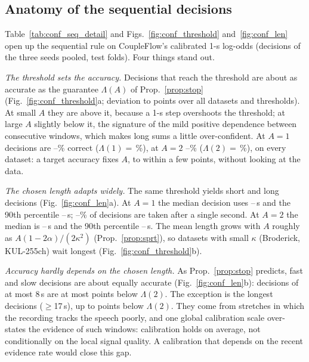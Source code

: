 \subsection{Anatomy of the sequential decisions}\label{app:conf:anatomy}
Table~\ref{tab:conf_seq_detail} and Figs.~\ref{fig:conf_threshold} and~\ref{fig:conf_len}
open up the sequential rule on CoupleFlow's calibrated 1-s log-odds (decisions of the three
seeds pooled, test folds). Four things stand out.

\emph{The threshold sets the accuracy.} Decisions that reach the threshold are about as
accurate as the guarantee $\Lambda(A)$ of Prop.~\ref{prop:stop}
(Fig.~\ref{fig:conf_threshold}a; deviation \confDetAboveMin{} to \confDetAboveMax{} points over
all datasets and thresholds). At small $A$ they are above it, because a 1-s step overshoots
the threshold; at large $A$ slightly below it, the signature of the mild positive dependence
between consecutive windows, which makes long sums a little over-confident. At $A{=}1$
decisions are \confDetOneAccMin--\confDetOneAccMax\% correct ($\Lambda(1)=$\,\confDetOneNominal\%),
at $A{=}2$ \confDetTwoAccMin--\confDetTwoAccMax\% ($\Lambda(2)=$\,\confDetTwoNominal\%), on every
dataset: a target accuracy fixes $A$, to within a few points, without looking at the data.

\emph{The chosen length adapts widely.} The same threshold yields short and long decisions
(Fig.~\ref{fig:conf_len}a). At $A{=}1$ the median decision uses
\confDetOneMedMin--\confDetOneMedMax\,s and the 90th percentile \confDetOnePNineMin--\confDetOnePNineMax\,s;
\confDetOneOneSec--\confDetOneOneSecMax\% of decisions are taken after a single second. At
$A{=}2$ the median is \confDetTwoMedMin--\confDetTwoMedMax\,s and the 90th percentile
\confDetTwoPNineMin--\confDetTwoPNineMax\,s. The mean length grows with $A$ roughly as
$A(1-2\alpha)/(2\kappa^2)$ (Prop.~\ref{prop:sprt}), so datasets with small $\kappa$ (Broderick,
KUL-255ch) wait longest (Fig.~\ref{fig:conf_threshold}b).

\emph{Accuracy hardly depends on the chosen length.} As Prop.~\ref{prop:stop} predicts, fast
and slow decisions are about equally accurate (Fig.~\ref{fig:conf_len}b): decisions of
at most 8\,s are at most \confDetShortDevMax{} points below $\Lambda(2)$. The exception is the
longest decisions ($\ge$17\,s), up to \confDetLongDevMax{} points below $\Lambda(2)$. They come
from stretches in which the recording tracks the speech poorly, and one global calibration
scale over-states the evidence of such windows: calibration holds on average, not
conditionally on the local signal quality. A calibration that depends on the recent evidence
rate would close this gap.

